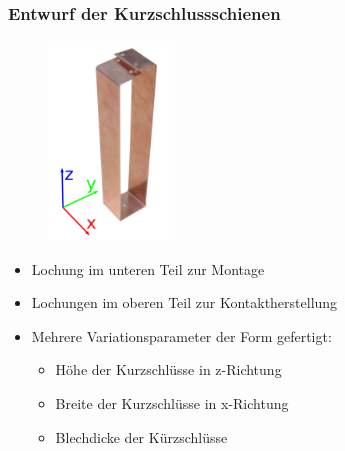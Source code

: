 \documentclass[accentcolor=tud9b, colorbacktitle, inverttitle]{tudbeamer}
\begin{document}
\begin{frame}\frametitle{Entwurf der Kurzschlussschienen}
\vspace{-1em}
\begin{multicols}{2}
	\begin{figure}[h]
		\centering
		\includegraphics[width=0.3\textwidth]{KS}
	\end{figure}
	\vfill\null
	\columnbreak
	\begin{itemize}
		\item Lochung im unteren Teil zur Montage
		\item Lochungen im oberen Teil zur Kontaktherstellung
		\item Mehrere Variationsparameter der Form gefertigt:
		\begin{itemize}
			\item H\"ohe der Kurzschl\"usse in z-Richtung
			\item Breite der Kurzschl\"usse in x-Richtung
			\item Blechdicke der K\"urzschl\"usse
		\end{itemize}
	\end{itemize}
	\vfill\null
\end{multicols}
\end{frame}
\end{document}
